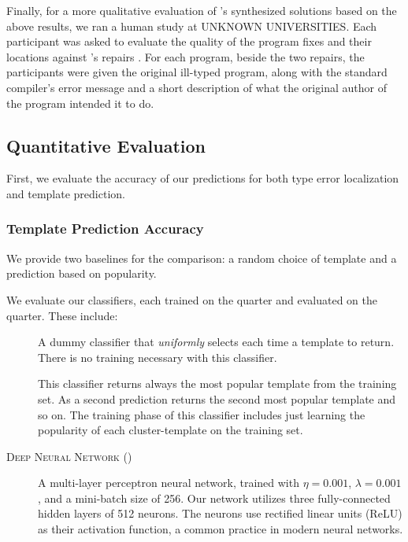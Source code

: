 Finally, for a more qualitative evaluation of \toolname's synthesized solutions
based on the above results, we ran a human study at UNKNOWN UNIVERSITIES. Each
participant was asked to evaluate the quality of the program fixes and their
locations against \seminal's repairs \citep[][]{Lerner2006-pj, Lerner2007-dt}.
For each program, beside the two repairs, the participants were given the
original ill-typed program, along with the standard \ocaml compiler's error
message and a short description of what the original author of the program
intended it to do.

\subsection{Quantitative Evaluation}
\label{subsec:quan_eval}

First, we evaluate the accuracy of our predictions for both type error
localization and template prediction.


\subsubsection{Template Prediction Accuracy}
\label{subsubsec:templ_acc}

We provide two baselines for the comparison: a random choice of template and a
prediction based on popularity.

We evaluate our classifiers, each trained on the \SPRING quarter and evaluated
on the \FALL quarter. These include:
\begin{description}
  \item[\random] A dummy classifier that \emph{uniformly} selects each time a
    template to return. There is no training necessary with this classifier.
  \item[\popular] This classifier returns always the most popular template from
    the training set. As a second prediction returns the second most popular
    template and so on. The training phase of this classifier includes just
    learning the popularity of each cluster-template on the training set.
  \item[\textsc{Deep Neural Network} (\dnn)] A multi-layer perceptron neural
    network, trained with $\eta = 0.001$, $\lambda = 0.001$, and a mini-batch
    size of 256. Our network utilizes three fully-connected hidden layers of 512
    neurons. The neurons use rectified linear units (ReLU) as their activation
    function, a common practice in modern neural networks.
\end{description}

